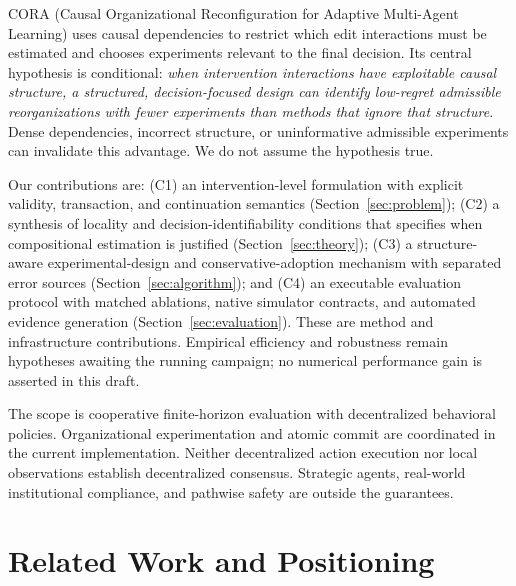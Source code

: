 \documentclass[runningheads]{llncs}
\begin{document}
CORA (Causal Organizational Reconfiguration for Adaptive Multi-Agent Learning) uses causal dependencies to restrict which edit interactions must be estimated and chooses experiments relevant to the final decision. Its central hypothesis is conditional: \emph{when intervention interactions have exploitable causal structure, a structured, decision-focused design can identify low-regret admissible reorganizations with fewer experiments than methods that ignore that structure.} Dense dependencies, incorrect structure, or uninformative admissible experiments can invalidate this advantage. We do not assume the hypothesis true.

Our contributions are: (C1) an intervention-level formulation with explicit validity, transaction, and continuation semantics (Section~\ref{sec:problem}); (C2) a synthesis of locality and decision-identifiability conditions that specifies when compositional estimation is justified (Section~\ref{sec:theory}); (C3) a structure-aware experimental-design and conservative-adoption mechanism with separated error sources (Section~\ref{sec:algorithm}); and (C4) an executable evaluation protocol with matched ablations, native simulator contracts, and automated evidence generation (Section~\ref{sec:evaluation}). These are method and infrastructure contributions. Empirical efficiency and robustness remain hypotheses awaiting the running campaign; no numerical performance gain is asserted in this draft.

The scope is cooperative finite-horizon evaluation with decentralized behavioral policies. Organizational experimentation and atomic commit are coordinated in the current implementation. Neither decentralized action execution nor local observations establish decentralized consensus. Strategic agents, real-world institutional compliance, and pathwise safety are outside the guarantees.

\section{Related Work and Positioning}\label{sec:related}
\end{document}
